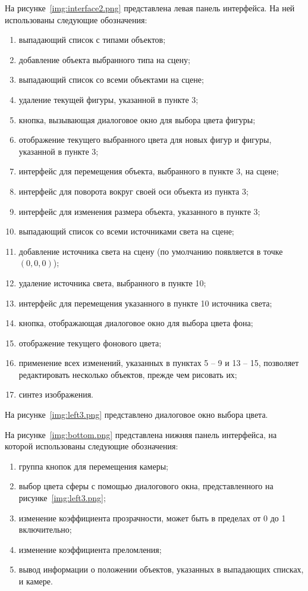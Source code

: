 На рисунке~\ref{img:interface2.png} представлена левая панель интерфейса.
На ней использованы следующие обозначения:
\begin{enumerate}
	\item выпадающий список с типами объектов;
	\item добавление объекта выбранного типа на сцену;
	\item выпадающий список со всеми объектами на сцене;
	\item удаление текущей фигуры, указанной в пункте 3;
	\item кнопка, вызывающая диалоговое окно для выбора цвета фигуры;
	\item отображение текущего выбранного цвета для новых фигур и фигуры, указанной в пункте 3;
	\item интерфейс для перемещения объекта, выбранного в пункте 3, на сцене;
	\item интерфейс для поворота вокруг своей оси объекта из пункта 3;
	\item интерфейс для изменения размера объекта, указанного в пункте 3;
	\item выпадающий список со всеми источниками света на сцене; 
	\item добавление источника света на сцену (по умолчанию появляется в точке $(0, 0, 0)$);
	\item удаление источника света, выбранного в пункте 10;
	\item интерфейс для перемещения указанного в пункте 10 источника света;
	\item кнопка, отображающая диалоговое окно для выбора цвета фона;
	\item отображение текущего фонового цвета;
	\item применение всех изменений, указанных в пунктах 5 -- 9 и 13 -- 15, позволяет редактировать несколько объектов, прежде чем рисовать их;
	\item синтез изображения.
\end{enumerate}

На рисунке~\ref{img:left3.png} представлено диалоговое окно выбора цвета.

На рисунке~\ref{img:bottom.png} представлена нижняя панель интерфейса, на которой использованы следующие обозначения:
\begin{enumerate}
	\item группа кнопок для перемещения камеры;
	\item выбор цвета сферы с помощью диалогового окна, представленного на рисунке~\ref{img:left3.png};
	\item изменение коэффициента прозрачности, может быть в пределах от 0 до 1 включительно;
	\item изменение коэффициента преломления;
	\item вывод информации о положении объектов, указанных в выпадающих списках, и камере.
\end{enumerate}

